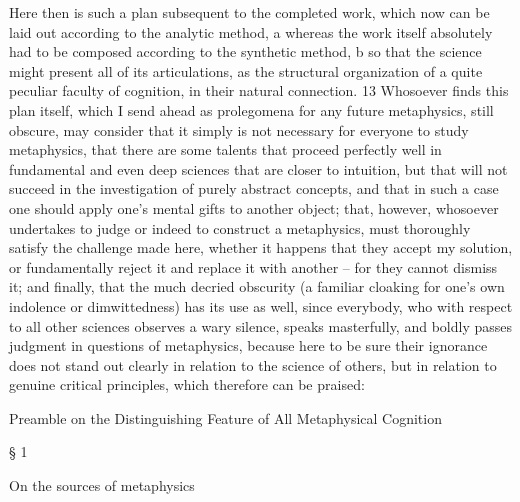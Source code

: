 Here then is such a plan subsequent to the completed work, which
now can be laid out according to the analytic method, a whereas the work
itself absolutely had to be composed according to the synthetic method, b
so that the science might present all of its articulations, as the structural
organization of a quite peculiar faculty of cognition, in their natural
connection. 13 Whosoever ﬁnds this plan itself, which I send ahead as
prolegomena for any future metaphysics, still obscure, may consider
that it simply is not necessary for everyone to study metaphysics, that
there are some talents that proceed perfectly well in fundamental and
even deep sciences that are closer to intuition, but that will not succeed
in the investigation of purely abstract concepts, and that in such a case
one should apply one’s mental gifts to another object; that, however,
whosoever undertakes to judge or indeed to construct a metaphysics,
must thoroughly satisfy the challenge made here, whether it happens that
they accept my solution, or fundamentally reject it and replace it with
another – for they cannot dismiss it; and ﬁnally, that the much decried
obscurity (a familiar cloaking for one’s own indolence or dimwittedness)
has its use as well, since everybody, who with respect to all other sciences
observes a wary silence, speaks masterfully, and boldly passes judgment
in questions of metaphysics, because here to be sure their ignorance does
not stand out clearly in relation to the science of others, but in relation
to genuine critical principles, which therefore can be praised:

Preamble on the
Distinguishing Feature of
All Metaphysical Cognition

§ 1

On the sources of metaphysics

